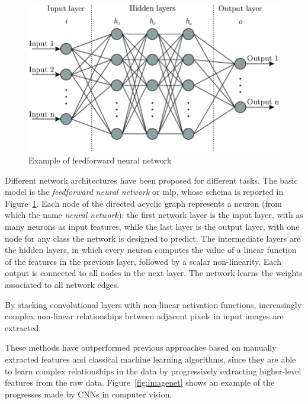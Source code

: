 \documentclass[%
    corpo=12pt,
    twoside,
    stile=classica,   
    tipotesi=magistrale,
    evenboxes,
    english,
	numerazioneromana,
]{toptesi}
\begin{document}
\begin{figure}[ht]
	\centering
	\includegraphics[width=.8\linewidth]{imgs/mlp.png}
	\caption{Example of feedforward neural network}
	\label{fig:mlp}
\end{figure}

Different network architectures have been proposed for different tasks. The basic model is the \textit{feedforward neural network} or \gls{mlp}, whose schema is reported in Figure~\ref{fig:mlp}. Each node of the directed acyclic graph represents a neuron (from which the name \textit{neural network}): the first network layer is the input layer, with as many neurons as input features, while the last layer is the output layer, with one node for any class the network is designed to predict. The intermediate layers are the hidden layers, in which every neuron computes the value of a linear function of the features in the previous layer, followed by a scalar non-linearity. Each output is connected to all nodes in the next layer. The network learns the weights associated to all network edges.

\bigskip
By stacking convolutional layers with non-linear activation functions, increasingly complex non-linear relationships between adjacent pixels in input images are extracted.

These methods have outperformed previous approaches based on manually extracted features and classical machine learning algorithms, since they are able to learn complex relationships in the data by progressively extracting higher-level features from the raw data. Figure~\ref{fig:imagenet} shows an example of the progresses made by CNNs in computer vision.
\end{document}
